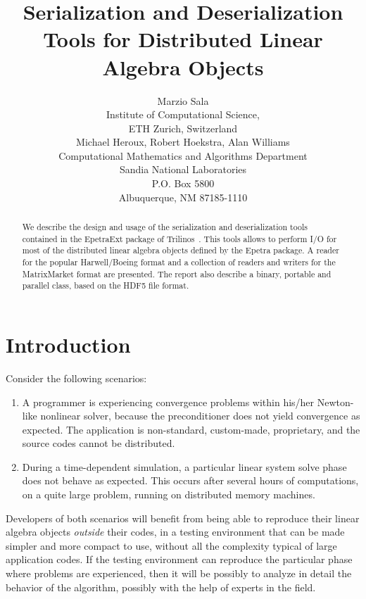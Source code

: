 \documentclass[11pt,relax]{SANDreport}
\author{Marzio Sala \\
Institute of Computational Science, \\
ETH Zurich, Switzerland \\[1cm]
Michael Heroux,   Robert Hoekstra, Alan Williams\\
Computational Mathematics and Algorithms Department \\
Sandia National Laboratories \\
P.O. Box 5800 \\
Albuquerque, NM 87185-1110 \\
}
\title{Serialization and Deserialization Tools for Distributed Linear Algebra Objects}
\begin{document}
\maketitle

\begin{abstract}
We describe the design and usage of the serialization and deserialization
tools contained in the EpetraExt package of
Trilinos~\cite{trilinos-home-page}. This tools allows to perform I/O for most
of the distributed linear algebra objects defined by the Epetra package. A
reader for the popular Harwell/Boeing format and a collection of readers and
writers for the MatrixMarket format are presented. The report also describe a
binary, portable and parallel class, based on the HDF5 file format.
\end{abstract}

\SANDmain

\tableofcontents

\newpage

\section{Introduction}
\label{sec:introduction}

Consider the following scenarios: 
\begin{enumerate}
\item A programmer is experiencing convergence
problems within his/her Newton-like nonlinear solver, because the
preconditioner does not yield convergence as expected. The application is
non-standard, custom-made, proprietary, and the source codes cannot be
distributed. 
\item During a time-dependent
simulation, a particular linear system solve phase does not behave as expected. 
This occurs after several
hours of computations, on a quite large problem, running on distributed memory
machines.
\end{enumerate}
Developers of both scenarios will benefit from being able to reproduce their
linear algebra objects {\sl outside} their codes, in a testing environment that
can be made simpler and more compact to use, without all the complexity
typical of large application codes. If the testing environment  can
reproduce the particular phase where problems are experienced, then it will be
possibly to analyze in detail the behavior of the algorithm, possibly with the
help of experts in the field.
\end{document}
